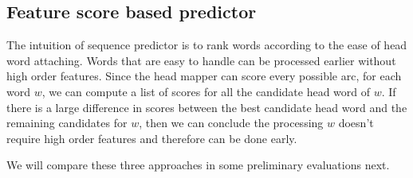 \subsection{Feature score based predictor}
The intuition of sequence predictor is to rank words
according to the ease of head word attaching.
Words that are easy to handle can be processed earlier without high order features.
Since the head mapper can score every possible arc,
for each word $w$, we can compute a list of scores for all the candidate
head word of $w$. If there is a large difference in scores between the best
candidate head word and the remaining candidates for $w$,
then we can conclude the processing $w$ doesn't require high order features
and therefore can be done early.

We will compare these three approaches in some preliminary evaluations next.




